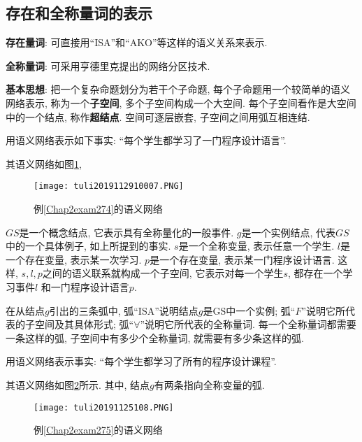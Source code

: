 \subsection{存在和全称量词的表示}
\begin{center}
\begin{minipage}{0.9\textwidth}
\textcolor[rgb]{0,0,1}{\textbf{存在量词}}: 可直接用“ISA”和“AKO”等这样的语义关系来表示.

\textcolor[rgb]{0,0,1}{\textbf{全称量词}}: 可采用亨德里克提出的网络分区技术.

\textcolor[rgb]{0,0,1}{\textbf{基本思想}}: 把一个复杂命题划分为若干个子命题, 每个子命题用一个较简单的语义网络表示, 称为一个\textbf{子空间}, 多个子空间构成一个大空间.
每个子空间看作是大空间中的一个结点, 称作\textbf{超结点}. 空间可逐层嵌套, 子空间之间用弧互相连结.
\end{minipage}
\end{center}

\begin{example}\label{Chap2exam274}
用语义网络表示如下事实: “每个学生都学习了一门程序设计语言”.
\end{example}
其语义网络如图\ref{AI32fig10007},
\begin{figure}[H]
\centering
\texttt{[image: tuli2019112910007.PNG]}
\caption{例\ref{Chap2exam274}的语义网络}
\label{AI32fig10007}
\end{figure}
\begin{flushleft}
      $GS$是一个概念结点, 它表示具有全称量化的一般事件.
      $g$是一个实例结点, 代表$GS$中的一个具体例子, 如上所提到的事实.
      $s$是一个全称变量, 表示任意一个学生.
      $l$是一个存在变量, 表示某一次学习.
      $p$是一个存在变量, 表示某一门程序设计语言. 这样, $s,l,p$之间的语义联系就构成一个子空间, 它表示对每一个学生$s$, 都存在一个学习事件$l$ 和一门程序设计语言$p$.
\end{flushleft}

\indent 在从结点$g$引出的三条弧中, 弧“ISA”说明结点$g$是GS中一个实例; 弧“$F$”说明它所代表的子空间及其具体形式; 弧“$\forall$”说明它所代表的全称量词.
每一个全称量词都需要一条这样的弧, 子空间中有多少个全称量词, 就需要有多少条这样的弧.
\begin{example}\label{Chap2exam275}
用语义网络表示事实: “每个学生都学习了所有的程序设计课程”.
\end{example}
其语义网络如图\ref{AI32fig1008}所示. 其中, 结点$g$有两条指向全称变量的弧.
\begin{figure}[H]
\centering
\texttt{[image: tuli20191125108.PNG]}
\caption{例\ref{Chap2exam275}的语义网络}
\label{AI32fig1008}
\end{figure}

